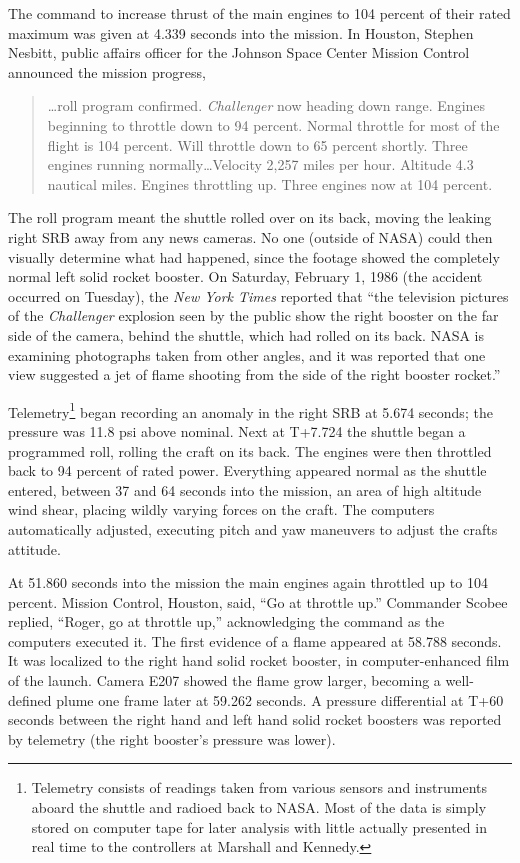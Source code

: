 The command to increase thrust of the main engines to 104 percent of their rated maximum was given at 4.339 seconds into the mission. In Houston, Stephen Nesbitt, public affairs officer for the Johnson Space Center Mission Control announced the mission progress,

\begin{singlespace}
\begin{quotation}
\noindent
\ldots roll program confirmed. {\em Challenger} now heading down range. Engines beginning to throttle down to 94 percent. Normal throttle for most of the flight is 104 percent. Will throttle down to 65 percent shortly. Three engines running normally\ldots Velocity 2,257 miles per hour. Altitude 4.3 nautical miles. Engines throttling up. Three engines now at 104 percent.
\end{quotation}
\end{singlespace}

The roll program meant the shuttle rolled over on its back, moving the leaking right SRB away from any news cameras. No one (outside of NASA) could then visually determine what had happened, since the footage showed the completely normal left solid rocket booster. On Saturday, February 1, 1986 (the accident occurred on Tuesday), the {\em New York Times} reported that ``the television pictures of the {\em Challenger} explosion seen by the public show the right booster on the far side of the camera, behind the shuttle, which had rolled on its back. NASA is examining photographs taken from other angles, and it was reported that one view suggested a jet of flame shooting from the side of the right booster rocket.''

Telemetry\footnote{Telemetry consists of readings taken from various sensors and instruments aboard the shuttle and radioed back to NASA. Most of the data is simply stored on computer tape for later analysis with little actually presented in real time to the controllers at Marshall and Kennedy.} began recording an anomaly in the right SRB at 5.674 seconds; the pressure was 11.8 psi above nominal. Next at T+7.724 the shuttle began a programmed roll, rolling the craft on its back. The engines were then throttled back to 94 percent of rated power. Everything appeared normal as the shuttle entered, between 37 and 64 seconds into the mission, an area of high altitude wind shear, placing wildly varying forces on the craft. The computers automatically adjusted, executing pitch and yaw maneuvers to adjust the crafts attitude.

At 51.860 seconds into the mission the main engines again throttled up to 104 percent. Mission Control, Houston, said, ``Go at throttle up.'' Commander Scobee replied, ``Roger, go at throttle up,'' acknowledging the command as the computers executed it. The first evidence of a flame appeared at 58.788 seconds. It was localized to the right hand solid rocket booster, in computer-enhanced film of the launch. Camera E207 showed the flame grow larger, becoming a well-defined plume one frame later at 59.262 seconds. A pressure differential at T+60 seconds between the right hand and left hand solid rocket boosters was reported by telemetry (the right booster's pressure was lower).

